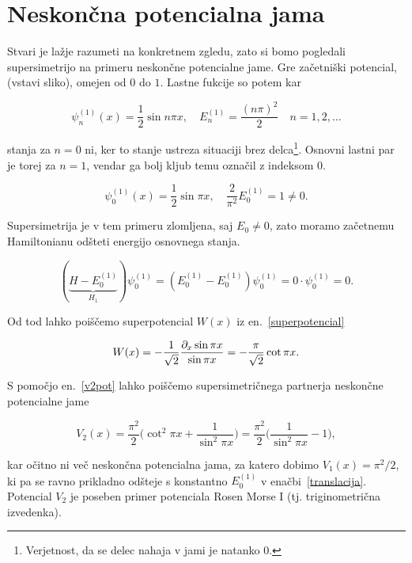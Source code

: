 \section{Neskon\v cna potencialna jama}

Stvari je la\v zje razumeti na konkretnem zgledu, zato si bomo pogledali supersimetrijo na primeru neskon\v cne
potencialne jame. Gre za\v cetni\v ski potencial, (vstavi sliko), omejen od $0$ do $1$. Lastne fukcije so potem kar

\begin{equation}
	\psi_n^{(1)} (x) = \frac{1}{2}\sin n\pi x, \quad E_n^{(1)} = \frac{(n\pi)^2}{2}
		\quad n = 1,2,\ldots
\end{equation}

\ni stanja za $n = 0$ ni, ker to stanje ustreza situaciji brez delca\footnote{Verjetnost, da se delec nahaja v jami
je natanko 0.}. Osnovni lastni par je torej za $n = 1$, vendar ga bolj kljub temu ozna\v cil z indeksom 0.

\begin{equation}
	\psi_0^{(1)} (x) = \frac{1}{2}\sin\pi x, \quad \frac{2}{\pi^2}E_0^{(1)} = 1 \neq 0.
\end{equation}

\ni Supersimetrija je v tem primeru zlomljena, saj $E_0 \neq 0$, zato moramo za\v cetnemu Hamiltonianu
od\v steti energijo osnovnega stanja.

\begin{equation}
	(\underbrace{H - E_0^{(1)}}_{H_1})\psi_0^{(1)} = (E_0^{(1)} - E_0^{(1)})\psi_0^{(1)} =
		0\cdot\psi_0^{(1)} = 0. \label{translacija}
\end{equation}

\ni Od tod lahko poi\v s\v cemo superpotencial $W(x)$ iz en.~\eqref{superpotencial}

\begin{equation}
	W(x) = -\frac{1}{\sqrt{2}} \frac{\partial_x \sin \pi x}{\sin \pi x} = -\frac{\pi}{\sqrt{2}}\cot \pi x.
\end{equation}

\ni S pomo\v cjo en.~\eqref{v2pot} lahko poi\v s\v cemo supersimetri\v cnega partnerja neskon\v cne potencialne jame

\begin{equation}
	V_2 (x) = \frac{\pi^2}{2}\bigg(\cot^2 \pi x + \frac{1}{\sin^2 \pi x}\bigg)
		= \frac{\pi^2}{2}\bigg(\frac{1}{\sin^2 \pi x} - 1\bigg),
	\label{pot-nes-jama}
\end{equation}

\ni kar o\v citno ni ve\v c neskon\v cna potencialna jama, za katero dobimo $V_1(x) = \pi^2/2$, ki pa se ravno
prikladno od\v steje s konstantno $E_0^{(1)}$ v ena\v cbi~\eqref{translacija}. Potencial $V_2$ je poseben primer
potenciala Rosen Morse I (tj. triginometri\v cna izvedenka).

